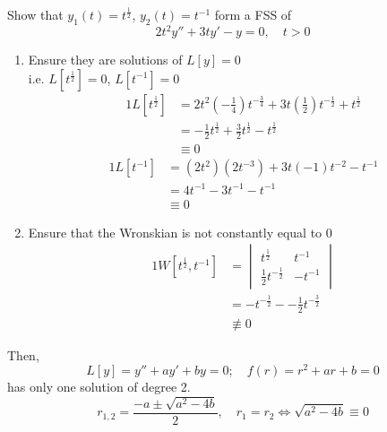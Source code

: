 \documentclass[twoside]{report}
\begin{document}
    \begin{example}
        Show that $y_{1}(t) = t^{\frac{1}{2}}$, $y_{2}(t) = t^{-1}$ form a FSS of
        \begin{equation}
            2t^{2}y'' + 3ty'-y=0,\quad t > 0
        \end{equation}
        \begin{enumerate}
            \item Ensure they are solutions of $L[y] = 0$\\
            i.e. $L[t^{\frac{1}{2}}] = 0$, $L[t^{-1}] = 0$
            \begin{alignat}{1}
                L[t^{\frac{1}{2}}] &= 2t^{2}(-\frac{1}{4})t^{-\frac{3}{4}}+3t(\frac{1}{2})t^{-\frac{1}{2}} + t^{\frac{1}{2}}\\
                &= -\frac{1}{2}t^{\frac{1}{2}} + \frac{3}{2}t^{\frac{1}{2}}-t^{\frac{1}{2}}\\
                &\equiv 0
            \end{alignat}
            \begin{alignat}{1}
                L[t^{-1}] &= (2t^{2})(2t^{-3}) + 3t(-1)t^{-2}-t^{-1}\\
                &= 4t^{-1} - 3t^{-1} - t^{-1}\\
                &\equiv 0
            \end{alignat}
            \item Ensure that the Wronskian is not constantly equal to 0
            \begin{alignat}{1}
                W[t^{\frac{1}{2}}, t^{-1}] &= \begin{vmatrix}
                    t^{\frac{1}{2}} & t^{-1}\\
                    \frac{1}{2}t^{-\frac{1}{2}} & -t^{-1}
                \end{vmatrix}\\
                &= -t^{-\frac{1}{2}} - -\frac{1}{2}t^{-\frac{3}{2}}\\
                &\nequiv 0
            \end{alignat}
        \end{enumerate}
        Then,
        \begin{equation}
            L[y] = y'' + ay' + by = 0;\quad f(r) = r^{2} + ar + b = 0
        \end{equation}
        has only one solution of degree 2.
        \begin{equation}
            r_{1,2} = \frac{-a\pm\sqrt{a^{2} - 4b}}{2},\quad r_{1} = r_{2} \iff \sqrt{a^{2} - 4b} \equiv 0
        \end{equation}
    \end{example}
\end{document}
